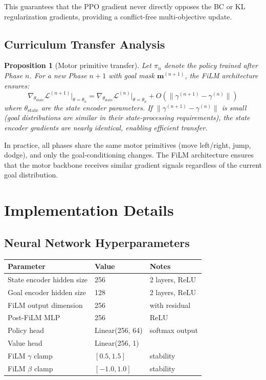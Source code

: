 \documentclass[11pt,a4paper]{article}
\newtheorem{proposition}{Proposition}
\begin{document}
This guarantees that the PPO gradient never directly opposes the BC or KL regularization gradients, providing a conflict-free multi-objective update.

\subsection{Curriculum Transfer Analysis}

\begin{proposition}[Motor primitive transfer]
Let $\pi_n$ denote the policy trained after Phase $n$.
For a new Phase $n+1$ with goal mask $\mathbf{m}^{(n+1)}$, the FiLM architecture ensures:
\begin{equation}
\nabla_{\theta_{\text{state}}} \mathcal{L}^{(n+1)} \big|_{\theta = \theta_n} = \nabla_{\theta_{\text{state}}} \mathcal{L}^{(n)} \big|_{\theta = \theta_n} + O(\|\gamma^{(n+1)} - \gamma^{(n)}\|)
\end{equation}
where $\theta_{\text{state}}$ are the state encoder parameters.
If $\|\gamma^{(n+1)} - \gamma^{(n)}\|$ is small (goal distributions are similar in their state-processing requirements), the state encoder gradients are nearly identical, enabling efficient transfer.
\end{proposition}

In practice, all phases share the same motor primitives (move left/right, jump, dodge), and only the goal-conditioning changes.
The FiLM architecture ensures that the motor backbone receives similar gradient signals regardless of the current goal distribution.

\section{Implementation Details}
\label{sec:implementation}

\subsection{Neural Network Hyperparameters}

\begin{table}[h]
\centering
\small
\begin{tabular}{@{}lll@{}}
\toprule
\textbf{Parameter} & \textbf{Value} & \textbf{Notes} \\
\midrule
State encoder hidden size & 256 & 2 layers, ReLU \\
Goal encoder hidden size & 128 & 2 layers, ReLU \\
FiLM output dimension & 256 & with residual \\
Post-FiLM MLP & 256 & ReLU \\
Policy head & Linear(256, 64) & softmax output \\
Value head & Linear(256, 1) & \\
FiLM $\gamma$ clamp & $[0.5, 1.5]$ & stability \\
FiLM $\beta$ clamp & $[-1.0, 1.0]$ & stability \\
\bottomrule
\end{tabular}
\end{table}
\end{document}
